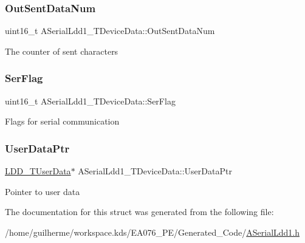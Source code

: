 \subsubsection{\texorpdfstring{Out\+Sent\+Data\+Num}{OutSentDataNum}}
{\footnotesize\ttfamily uint16\+\_\+t A\+Serial\+Ldd1\+\_\+\+T\+Device\+Data\+::\+Out\+Sent\+Data\+Num}

The counter of sent characters \mbox{\label{struct_a_serial_ldd1___t_device_data_affb5a6a3a2d0c0dc54c04a66b2e1ada0}} 
\subsubsection{\texorpdfstring{Ser\+Flag}{SerFlag}}
{\footnotesize\ttfamily uint16\+\_\+t A\+Serial\+Ldd1\+\_\+\+T\+Device\+Data\+::\+Ser\+Flag}

Flags for serial communication \mbox{\label{struct_a_serial_ldd1___t_device_data_a7fed00148f2be816d5e81f693ced1df7}} 
\subsubsection{\texorpdfstring{User\+Data\+Ptr}{UserDataPtr}}
{\footnotesize\ttfamily \hyperlink{group___p_e___types__module_ga0b66a73f87238a782318aa0be7578e35}{L\+D\+D\+\_\+\+T\+User\+Data}$\ast$ A\+Serial\+Ldd1\+\_\+\+T\+Device\+Data\+::\+User\+Data\+Ptr}

Pointer to user data 

The documentation for this struct was generated from the following file\+:\begin{DoxyCompactItemize}
\item 
/home/guilherme/workspace.\+kds/\+E\+A076\+\_\+\+P\+E/\+Generated\+\_\+\+Code/\hyperlink{_a_serial_ldd1_8h}{A\+Serial\+Ldd1.\+h}\end{DoxyCompactItemize}

